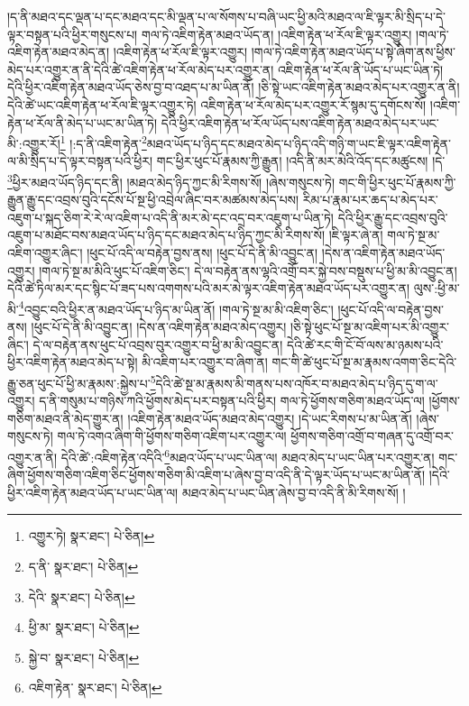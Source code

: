 །ད་ནི་མཐའ་དང་ལྡན་པ་དང་མཐའ་དང་མི་ལྡན་པ་ལ་སོགས་པ་བཞི་ཡང་ཕྱི་མའི་མཐའ་ལ་ཇི་ལྟར་མི་སྲིད་པ་དེ་ལྟར་བསྟན་པའི་ཕྱིར་གསུངས་པ། གལ་ཏེ་འཇིག་རྟེན་མཐའ་ཡོད་ན། །འཇིག་རྟེན་ཕ་རོལ་ཇི་ལྟར་འགྱུར། །གལ་ཏེ་འཇིག་རྟེན་མཐའ་མེད་ན། །འཇིག་རྟེན་ཕ་རོལ་ཇི་ལྟར་འགྱུར། །གལ་ཏེ་འཇིག་རྟེན་མཐའ་ཡོད་པ་སྟེ་ཞིག་ནས་ཕྱིས་མེད་པར་འགྱུར་ན་ནི་དེའི་ཚེ་འཇིག་རྟེན་ཕ་རོལ་མེད་པར་འགྱུར་ན། འཇིག་རྟེན་ཕ་རོལ་ནི་ཡོད་པ་ཡང་ཡིན་ཏེ། དེའི་ཕྱིར་འཇིག་རྟེན་མཐའ་ཡོད་ཅེས་བྱ་བ་འཐད་པ་མ་ཡིན་ནོ། །ཅི་སྟེ་ཡང་འཇིག་རྟེན་མཐའ་མེད་པར་འགྱུར་ན་ནི། དེའི་ཚེ་ཡང་འཇིག་རྟེན་ཕ་རོལ་ཇི་ལྟར་འགྱུར་ཏེ། འཇིག་རྟེན་ཕ་རོལ་མེད་པར་འགྱུར་རོ་སྙམ་དུ་དགོངས་སོ། །འཇིག་རྟེན་ཕ་རོལ་ནི་མེད་པ་ཡང་མ་ཡིན་ཏེ། དེའི་ཕྱིར་འཇིག་རྟེན་ཕ་རོལ་ཡོད་པས་འཇིག་རྟེན་མཐའ་མེད་པར་ཡང་མི་:འགྱུར་རོ།\footnote{འགྱུར་ཏེ།  སྣར་ཐང་།  པེ་ཅིན། } །:ད་ནི་འཇིག་རྟེན་\footnote{ད་ནི་  སྣར་ཐང་།  པེ་ཅིན། }མཐའ་ཡོད་པ་ཉིད་དང་མཐའ་མེད་པ་ཉིད་འདི་གཉི་ག་ཡང་ཇི་ལྟར་འཇིག་རྟེན་ལ་མི་སྲིད་པ་དེ་ལྟར་བསྟན་པའི་ཕྱིར། གང་ཕྱིར་ཕུང་པོ་རྣམས་ཀྱི་རྒྱུན། །འདི་ནི་མར་མེའི་འོད་དང་མཚུངས། །དེ་\footnote{དེའི་  སྣར་ཐང་།  པེ་ཅིན། }ཕྱིར་མཐའ་ཡོད་ཉིད་དང་ནི། །མཐའ་མེད་ཉིད་ཀྱང་མི་རིགས་སོ། །ཞེས་གསུངས་ཏེ། གང་གི་ཕྱིར་ཕུང་པོ་རྣམས་ཀྱི་རྒྱུན་རྒྱུ་དང་འབྲས་བུའི་དངོས་པོ་སྔ་ཕྱི་འབྲེལ་ཞིང་བར་མཚམས་མེད་པས། རིམ་པ་རྣམ་པར་ཆད་པ་མེད་པར་འཇུག་པ་སྐད་ཅིག་རེ་རེ་ལ་འཇིག་པ་འདི་ནི་མར་མེ་དང་འདྲ་བར་འཇུག་པ་ཡིན་ཏེ། དེའི་ཕྱིར་རྒྱུ་དང་འབྲས་བུའི་འཇུག་པ་མཐོང་བས་མཐའ་ཡོད་པ་ཉིད་དང་མཐའ་མེད་པ་ཉིད་ཀྱང་མི་རིགས་སོ། །ཇི་ལྟར་ཞེ་ན། གལ་ཏེ་སྔ་མ་འཇིག་འགྱུར་ཞིང་། །ཕུང་པོ་འདི་ལ་བརྟེན་བྱས་ནས། །ཕུང་པོ་དེ་ནི་མི་འབྱུང་ན། །དེས་ན་འཇིག་རྟེན་མཐའ་ཡོད་འགྱུར། །གལ་ཏེ་སྔ་མ་མིའི་ཕུང་པོ་འཇིག་ཅིང་། དེ་ལ་བརྟེན་ནས་ལྷའི་འགྲོ་བར་སྐྱེ་བས་བསྡུས་པ་ཕྱི་མ་མི་འབྱུང་ན། དེའི་ཚེ་ཏིལ་མར་དང་སྙིང་པོ་ཟད་པས་འགགས་པའི་མར་མེ་ལྟར་འཇིག་རྟེན་མཐའ་ཡོད་པར་འགྱུར་ན། ལུས་:ཕྱི་མ་མི་\footnote{ཕྱི་མ་  སྣར་ཐང་།  པེ་ཅིན། }འབྱུང་བའི་ཕྱིར་ན་མཐའ་ཡོད་པ་ཉིད་མ་ཡིན་ནོ། །གལ་ཏེ་སྔ་མ་མི་འཇིག་ཅིང་། །ཕུང་པོ་འདི་ལ་བརྟེན་བྱས་ནས། །ཕུང་པོ་དེ་ནི་མི་འབྱུང་ན། །དེས་ན་འཇིག་རྟེན་མཐའ་མེད་འགྱུར། །ཅི་སྟེ་ཕུང་པོ་སྔ་མ་འཇིག་པར་མི་འགྱུར་ཞིང་། དེ་ལ་བརྟེན་ནས་ཕུང་པོ་འབྲས་བུར་འགྱུར་བ་ཕྱི་མ་མི་འབྱུང་ན། དེའི་ཚེ་རང་གི་ངོ་བོ་ལས་མ་ཉམས་པའི་ཕྱིར་འཇིག་རྟེན་མཐའ་མེད་པ་སྟེ། མི་འཇིག་པར་འགྱུར་བ་ཞིག་ན། གང་གི་ཚེ་ཕུང་པོ་སྔ་མ་རྣམས་འགག་ཅིང་དེའི་རྒྱུ་ཅན་ཕུང་པོ་ཕྱི་མ་རྣམས་:སྐྱེས་པ་\footnote{སྐྱེ་བ་  སྣར་ཐང་།  པེ་ཅིན། }དེའི་ཚེ་སྔ་མ་རྣམས་མི་གནས་པས་འཁོར་བ་མཐའ་མེད་པ་ཉིད་དུ་ག་ལ་འགྱུར། ད་ནི་གསུམ་པ་གཉིས་ཀའི་ཕྱོགས་མེད་པར་བསྟན་པའི་ཕྱིར། གལ་ཏེ་ཕྱོགས་གཅིག་མཐའ་ཡོད་ལ། །ཕྱོགས་གཅིག་མཐའ་ནི་མེད་གྱུར་ན། །འཇིག་རྟེན་མཐའ་ཡོད་མཐའ་མེད་འགྱུར། །དེ་ཡང་རིགས་པ་མ་ཡིན་ནོ། །ཞེས་གསུངས་ཏེ། གལ་ཏེ་འགའ་ཞིག་གི་ཕྱོགས་གཅིག་འཇིག་པར་འགྱུར་ལ། ཕྱོགས་གཅིག་འགྲོ་བ་གཞན་དུ་འགྲོ་བར་འགྱུར་ན་ནི། དེའི་ཚེ་:འཇིག་རྟེན་འདིའི་\footnote{འཇིག་རྟེན་  སྣར་ཐང་།  པེ་ཅིན། }མཐའ་ཡོད་པ་ཡང་ཡིན་ལ། མཐའ་མེད་པ་ཡང་ཡིན་པར་འགྱུར་ན། གང་ཞིག་ཕྱོགས་གཅིག་འཇིག་ཅིང་ཕྱོགས་གཅིག་མི་འཇིག་པ་ཞེས་བྱ་བ་འདི་ནི་དེ་ལྟར་ཡོད་པ་ཡང་མ་ཡིན་ནོ། །དེའི་ཕྱིར་འཇིག་རྟེན་མཐའ་ཡོད་པ་ཡང་ཡིན་ལ། མཐའ་མེད་པ་ཡང་ཡིན་ཞེས་བྱ་བ་འདི་ནི་མི་རིགས་སོ། །
